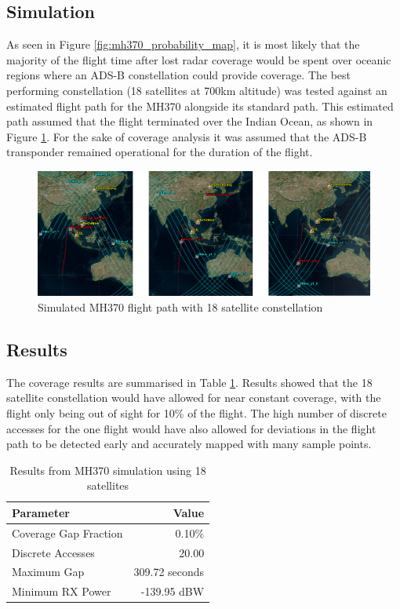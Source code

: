 \subsection{Simulation}
As seen in Figure \ref{fig:mh370_probability_map}, it is most likely that the majority of the flight time after lost radar coverage would be spent over oceanic regions where an ADS-B constellation could provide coverage. The best performing constellation (18 satellites at 700km altitude) was tested against an estimated flight path for the MH370 alongside its standard path. This estimated path assumed that the flight terminated over the Indian Ocean, as shown in Figure \ref{fig:mh370_tot}. For the sake of coverage analysis it was assumed that the ADS-B transponder remained operational for the duration of the flight.
\begin{figure}[H]
	\centering
	\includegraphics[scale = 0.45]{Pictures/mh370_tot.png}
	
	\caption{Simulated MH370 flight path with 18 satellite constellation}
	\label{fig:mh370_tot}
\end{figure}
\subsection{Results}
The coverage results are summarised in Table \ref{tab:mh370_results}. Results showed that the 18 satellite constellation would have allowed for near constant coverage, with the flight only being out of sight for 10\% of the flight. The high number of discrete accesses for the one flight would have also allowed for deviations in the flight path to be detected early and accurately mapped with many sample points.
\begin{table}[htbp]
  \centering
  \caption{Results from MH370 simulation using 18 satellites}
    \begin{tabular}{lr}
    \toprule
    Parameter & Value \\
    \midrule
    Coverage Gap Fraction & 0.10\% \\
    Discrete Accesses & 20.00 \\
    Maximum Gap & 309.72 seconds \\
    Minimum RX Power & -139.95 dBW \\
    \bottomrule
    \end{tabular}%
  \label{tab:mh370_results}%
\end{table}%
